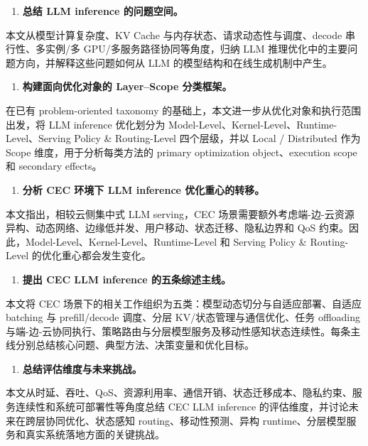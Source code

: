 \documentclass[a4paper,twocolumn,10pt]{ctexart}
\begin{document}
\begin{enumerate}
\item \textbf{总结 LLM inference 的问题空间。}
\end{enumerate}
本文从模型计算复杂度、KV Cache 与内存状态、请求动态性与调度、decode 串行性、多实例/多 GPU/多服务路径协同等角度，归纳 LLM 推理优化中的主要问题方向，并解释这些问题如何从 LLM 的模型结构和在线生成机制中产生。


\begin{enumerate}
\item \textbf{构建面向优化对象的 Layer–Scope 分类框架。}
\end{enumerate}
在已有 problem-oriented taxonomy 的基础上，本文进一步从优化对象和执行范围出发，将 LLM inference 优化划分为 Model-Level、Kernel-Level、Runtime-Level、Serving Policy \& Routing-Level 四个层级，并以 Local / Distributed 作为 Scope 维度，用于分析每类方法的 primary optimization object、execution scope 和 secondary effects。


\begin{enumerate}
\item \textbf{分析 CEC 环境下 LLM inference 优化重心的转移。}
\end{enumerate}
本文指出，相较云侧集中式 LLM serving，CEC 场景需要额外考虑端-边-云资源异构、动态网络、边缘低并发、用户移动、状态迁移、隐私边界和 QoS 约束。因此，Model-Level、Kernel-Level、Runtime-Level 和 Serving Policy \& Routing-Level 的优化重心都会发生变化。


\begin{enumerate}
\item \textbf{提出 CEC LLM inference 的五条综述主线。}
\end{enumerate}
本文将 CEC 场景下的相关工作组织为五类：模型动态切分与自适应部署、自适应 batching 与 prefill/decode 调度、分层 KV/状态管理与通信优化、任务 offloading 与端-边-云协同执行、策略路由与分层模型服务及移动性感知状态连续性。每条主线分别总结核心问题、典型方法、决策变量和优化目标。


\begin{enumerate}
\item \textbf{总结评估维度与未来挑战。}
\end{enumerate}
本文从时延、吞吐、QoS、资源利用率、通信开销、状态迁移成本、隐私约束、服务连续性和系统可部署性等角度总结 CEC LLM inference 的评估维度，并讨论未来在跨层协同优化、状态感知 routing、移动性预测、异构 runtime、分层模型服务和真实系统落地方面的关键挑战。
\end{document}
